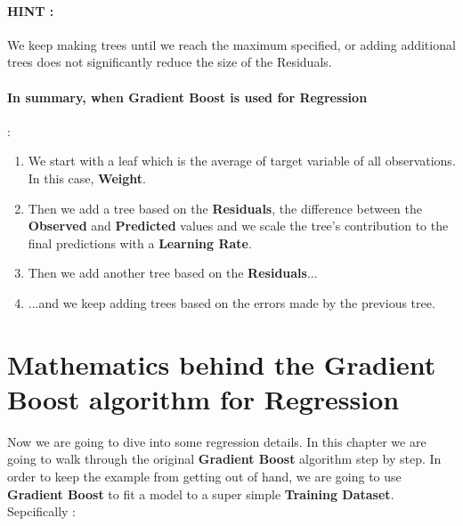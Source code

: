 \documentclass[12pt, a4paper]{article} %
\begin{document}
\paragraph{HINT :} We keep making trees until we reach the maximum specified, or adding additional trees does not significantly reduce the size of the \textbf{}{Residuals}.

\paragraph{In summary, when Gradient Boost is used for Regression}:

\begin{enumerate}

    \item We start with a leaf which is the average of target variable of all observations. In this case, \textbf{Weight}.
    
    \item Then we add a tree based on the \textbf{Residuals}, the difference between the \textbf{Observed} and \textbf{Predicted} values and we scale the tree's contribution to the final predictions with a \textbf{Learning Rate}.
    
    \item Then we add another tree based on the \textbf{Residuals}...
    
    \item ...and we keep adding trees based on the errors made by the previous tree.
\end{enumerate}



\section{Mathematics behind the Gradient Boost algorithm for Regression}


Now we are going to dive into some regression details. In this chapter we are going to walk through the original \textbf{Gradient Boost} algorithm step by step.
In order to keep the example from getting out of hand, we are going to use \textbf{Gradient Boost} to fit a model to a super simple \textbf{Training Dataset}. Sepcifically :
\end{document}

